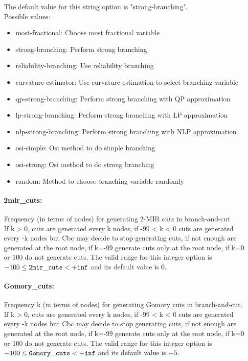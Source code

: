 The default value for this string option is "strong-branching".
\\ 
Possible values:
\begin{itemize}
   \item most-fractional: Choose most fractional variable
   \item strong-branching: Perform strong branching
   \item reliability-branching: Use reliability branching
   \item curvature-estimator: Use curvature estimation to select branching
variable
   \item qp-strong-branching: Perform strong branching with QP approximation
   \item lp-strong-branching: Perform strong branching with LP approximation
   \item nlp-strong-branching: Perform strong branching with NLP approximation
   \item osi-simple: Osi method to do simple branching
   \item osi-strong: Osi method to do strong branching
   \item random: Method to choose branching variable randomly
\end{itemize}

\paragraph{2mir\_cuts:}\label{sec:2mir_cuts} Frequency (in terms of nodes) for generating 2-MIR cuts in branch-and-cut $\;$ \\
 If k > 0, cuts are generated every k nodes, if
-99 < k < 0 cuts are generated every -k nodes but
Cbc may decide to stop generating cuts, if not
enough are generated at the root node, if k=-99
generate cuts only at the root node, if k=0 or
100 do not generate cuts. The valid range for this integer option is
$-100 \le {\tt 2mir\_cuts } <  {\tt +inf}$
and its default value is $0$.


\paragraph{Gomory\_cuts:}\label{sec:Gomory_cuts} Frequency k (in terms of nodes) for generating Gomory cuts in branch-and-cut. $\;$ \\
 If k > 0, cuts are generated every k nodes, if
-99 < k < 0 cuts are generated every -k nodes but
Cbc may decide to stop generating cuts, if not
enough are generated at the root node, if k=-99
generate cuts only at the root node, if k=0 or
100 do not generate cuts. The valid range for this integer option is
$-100 \le {\tt Gomory\_cuts } <  {\tt +inf}$
and its default value is $-5$.


